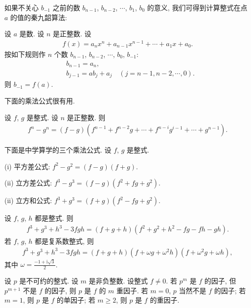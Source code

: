 如果不关心 $b_{-1}$ 之前的数 $b_{n-1}$, $b_{n-2}$, $\cdots$, $b_1$, $b_0$ 的意义, 我们可得到计算整式在点 $a$ 的值的秦九韶算法:
\begin{proposition}
    设 $a$ 是数. 设 $n$ 是正整数. 设
    \begin{align*}
        f(x) = a_n x^n + a_{n-1} x^{n-1} + \cdots + a_1 x + a_0.
    \end{align*}
    按如下规则作 $n$ 个数 $b_{n-1}$, $b_{n-2}$, $\cdots$, $b_0$, $b_{-1}$:
    \begin{align*}
         & b_{n-1} = a_n,                                     \\
         & b_{j-1} = ab_j + a_j \quad (j = n-1,n-2,\cdots,0).
    \end{align*}
    则 $b_{-1} = f(a)$.
\end{proposition}

下面的乘法公式很有用.
\begin{proposition}
    设 $f$, $g$ 是整式. 设 $n$ 是正整数. 则
    \begin{align*}
        f^n - g^n = (f - g)(f^{n-1} + f^{n-2} g + \cdots + f^{n-i} g^{i-1} + \cdots + g^{n-1}).
    \end{align*}
\end{proposition}

\begin{proposition}
    下面是中学算学的三个乘法公式. 设 $f$, $g$ 是整式.

    (i) 平方差公式: $f^2 - g^2 = (f - g)(f + g)$.

    (ii) 立方差公式: $f^3 - g^3 = (f - g)(f^2 + fg + g^2)$.

    (ii) 立方和公式: $f^3 + g^3 = (f + g)(f^2 - fg + g^2)$.
\end{proposition}

\begin{proposition}
    设 $f$, $g$, $h$ 都是整式. 则
    \begin{align*}
        f^3 + g^3 + h^3 - 3fgh = (f + g + h)(f^2 + g^2 + h^2 - fg - fh - gh).
    \end{align*}
    若 $f$, $g$, $h$ 都是复系数整式, 则
    \begin{align*}
        f^3 + g^3 + h^3 - 3fgh = (f + g + h) (f + \omega g + \omega^2 h) (f + \omega^2 g + \omega h),
    \end{align*}
    其中 $\omega = \frac{-1 + \mathrm{i} \sqrt{3}}{2}$.
\end{proposition}

\begin{definition}
    设 $p$ 是不可约的整式. 设 $m$ 是非负整数. 设整式 $f \neq 0$. 若 $p^m$ 是 $f$ 的因子, 但 $p^{m+1}$ 不是 $f$ 的因子, 则 $p$ 是 $f$ 的 $m$ 重因子. 若 $m = 0$, $p$ 当然不是 $f$ 的因子; 若 $m = 1$, 则 $p$ 是 $f$ 的单因子; 若 $m \geq 2$, 则 $p$ 是 $f$ 的重因子.
\end{definition}

